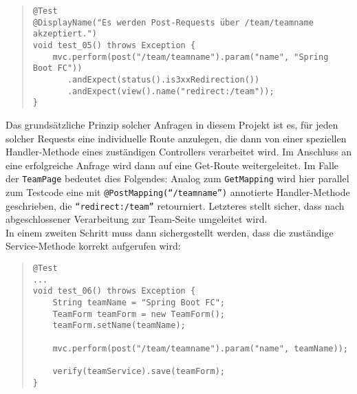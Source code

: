 \begin{quote}
\begin{verbatim}
@Test
@DisplayName("Es werden Post-Requests über /team/teamname akzeptiert.")
void test_05() throws Exception {
    mvc.perform(post("/team/teamname").param("name", "Spring Boot FC"))
       .andExpect(status().is3xxRedirection())
       .andExpect(view().name("redirect:/team"));
}
\end{verbatim}
\end{quote}

Das grundsätzliche Prinzip solcher Anfragen in diesem Projekt ist es, für jeden 
solcher Requests eine individuelle Route anzulegen, die dann von einer speziellen 
Handler-Methode eines zuständigen Controllers verarbeitet wird. Im Anschluss an 
eine erfolgreiche Anfrage wird dann auf eine Get-Route weitergeleitet. Im Falle der 
\texttt{TeamPage} bedeutet dies Folgendes: Analog zum \texttt{GetMapping} wird hier 
parallel zum Testcode eine mit \texttt{@PostMapping(``/teamname'')} annotierte 
Handler-Methode geschrieben, die \texttt{``redirect:/team''} retourniert. Letzteres 
stellt sicher, dass nach abgeschlossener Verarbeitung zur Team-Seite umgeleitet 
wird. \\ 
In einem zweiten Schritt muss dann sichergestellt werden, dass die zuständige 
Service-Methode korrekt aufgerufen wird: 

\begin{quote}
\begin{verbatim}
@Test
...
void test_06() throws Exception {
    String teamName = "Spring Boot FC";
    TeamForm teamForm = new TeamForm();
    teamForm.setName(teamName);

    mvc.perform(post("/team/teamname").param("name", teamName));

    verify(teamService).save(teamForm);
}
\end{verbatim}
\end{quote}

